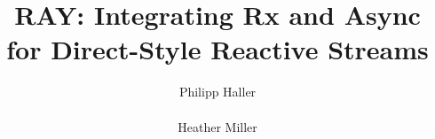 \documentclass{acm_proc_article-sp}
\begin{document}
\title{RAY: Integrating Rx and Async for Direct-Style Reactive Streams}
%
%
%
%
%

%
\author{
%
%
\alignauthor
Philipp Haller\\
       \\
\alignauthor
Heather Miller\\
       \\
}
\end{document}
